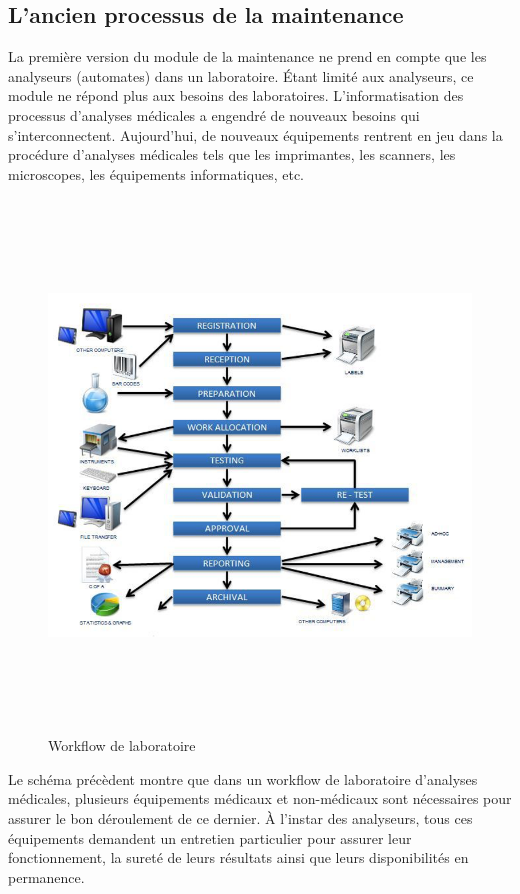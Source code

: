 \subsection{L'ancien processus de la maintenance}
La première version du module de la maintenance ne prend en compte que les analyseurs 
(automates) dans un laboratoire. Étant limité aux analyseurs, ce module ne répond plus
 aux besoins des laboratoires.
L’informatisation des processus d’analyses médicales a engendré de nouveaux besoins qui 
s’interconnectent.
Aujourd’hui, de nouveaux équipements rentrent en jeu dans la procédure 
d’analyses médicales tels que les imprimantes, les scanners, les microscopes, 
les équipements informatiques, etc.
\begin{figure}[hp]
    \centering
    \includegraphics[width=400pt,height=400pt]{images/processus_old.png}
    \caption{Workflow de laboratoire}
\end{figure}

Le schéma précèdent montre que dans un workflow de laboratoire d’analyses médicales, 
plusieurs équipements médicaux et non-médicaux sont nécessaires pour assurer le bon 
déroulement de ce dernier. 
À l’instar des analyseurs, tous ces équipements demandent un entretien particulier 
pour assurer leur fonctionnement, la sureté de leurs résultats ainsi que leurs 
disponibilités en permanence. 
\pagebreak

